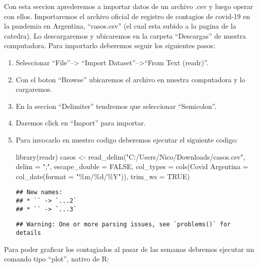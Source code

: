 \documentclass[preprint, 3p,
authoryear]{elsarticle} %
\newenvironment{Shaded}{\begin{snugshade}}{\end{snugshade}}
\newcommand{\AttributeTok}[1]{\textcolor[rgb]{0.77,0.63,0.00}{#1}}
\newcommand{\ConstantTok}[1]{\textcolor[rgb]{0.00,0.00,0.00}{#1}}
\newcommand{\FunctionTok}[1]{\textcolor[rgb]{0.00,0.00,0.00}{#1}}
\newcommand{\NormalTok}[1]{#1}
\newcommand{\OtherTok}[1]{\textcolor[rgb]{0.56,0.35,0.01}{#1}}
\newcommand{\StringTok}[1]{\textcolor[rgb]{0.31,0.60,0.02}{#1}}
\begin{document}
Con esta seccion aprederemos a importar datos de un archivo .csv y luego
operar con ellos. Importaremos el archivo oficial de registro de
contagios de covid-19 en la pandemia en Argentina, ``casos.csv'' (el
cual esta subido a la pagina de la catedra). Lo descargaremos y
ubicaremos en la carpeta ``Descargas'' de nuestra computadora. Para
importarlo deberemos seguir los siguientes pasos:

\begin{enumerate}
\def\labelenumi{\arabic{enumi}.}
\item
  Seleccionar ``File''--\textgreater{} ``Import
  Dataset''--\textgreater{}``From Text (readr)''.
\item
  Con el boton ``Browse'' ubicaremos el archivo en nuestra computadora y
  lo cargaremos.
\item
  En la seccion ``Delimiter'' tendremos que seleccionar ``Semicolon''.
\item
  Daremos click en ``Import'' para importar.
\item
  Para invocarlo en nuestro codigo deberemos ejecutar el siguiente
  codigo:

\begin{Shaded}
\begin{Highlighting}[]
\FunctionTok{library}\NormalTok{(readr)}
\NormalTok{casos }\OtherTok{\textless{}{-}} \FunctionTok{read\_delim}\NormalTok{(}\StringTok{"C:/Users/Nico/Downloads/casos.csv"}\NormalTok{,}
\AttributeTok{delim =} \StringTok{";"}\NormalTok{, }\AttributeTok{escape\_double =} \ConstantTok{FALSE}\NormalTok{, }\AttributeTok{col\_types =} \FunctionTok{cols}\NormalTok{(}\StringTok{\textasciigrave{}}\AttributeTok{Covid Argentina}\StringTok{\textasciigrave{}} \OtherTok{=} \FunctionTok{col\_date}\NormalTok{(}\AttributeTok{format =} \StringTok{"\%m/\%d/\%Y"}\NormalTok{)),}
\AttributeTok{trim\_ws =} \ConstantTok{TRUE}\NormalTok{)}
\end{Highlighting}
\end{Shaded}

\begin{verbatim}
## New names:
## * `` -> `...2`
## * `` -> `...3`
\end{verbatim}

\begin{verbatim}
## Warning: One or more parsing issues, see `problems()` for details
\end{verbatim}
\end{enumerate}

Para poder graficar los contagiados al pasar de las semanas debremos
ejecutar un comando tipo ``plot'', nativo de R:
\end{document}
